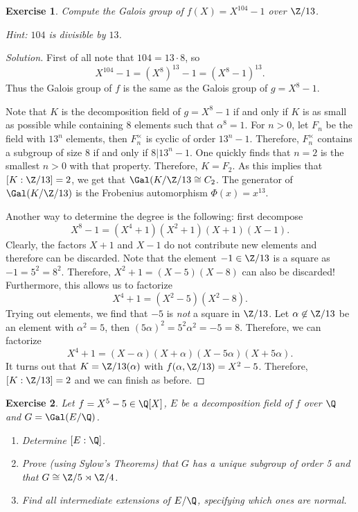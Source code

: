 \documentclass[a4paper,10pt,reqno]{amsart}
\newtheorem{ex}{Exercise}[section]
\newenvironment{sol}
  {\renewcommand\qedsymbol{$\blacksquare$}\begin{proof}[Solution]}
  {\end{proof}}
\begin{document}
\begin{ex}
\label{12.2}
    Compute the Galois group of $f(X)=X^{104}-1$
    over $\Z/{13}$.

    \noindent \textit{Hint:} $104$ is divisible by $13$.
\end{ex}
\begin{sol}
    First of all note that $104=13\cdot 8$,
so
$$X^{104}-1=(X^8)^{13}-1=(X^8-1)^{13}.$$
Thus the Galois group of $f$ is the 
same as the Galois group of $g=X^8-1$.

Note that $K$ is the decomposition field of $g=X^8-1$ if and only if $K$ is as small as possible while containing $8$ elements such that $\alpha^8 = 1$. For $n > 0$, let $F_n$ be the field with $13^n$ elements, then $F_n^{\times}$ is cyclic of order $13^n - 1$. Therefore, $F_n^{\times}$ contains a subgroup of size $8$ if and only if $8|13^n-1$. One quickly finds that $n=2$ is the smallest $n > 0$ with that property. Therefore, $K = F_2$. As this implies that $[K:\Z/{13}] = 2$, we get that $\Gal(K/\Z/{13} \cong C_2$. The generator of $\Gal(K/\Z/{13})$ is the Frobenius automorphism $\Phi(x) = x^{13}$.

Another way to determine the degree is the following: first decompose
\[
X^8 - 1 = (X^4 + 1) (X^2 + 1)(X+1)(X-1).
\]
Clearly, the factors $X+1$ and $X-1$ do not contribute new elements and therefore can be discarded. Note that the element $- 1 \in \Z/{13}$ is a square as $-1 = 5^2 = 8^2$. Therefore, $X^2 + 1 = (X-5)(X-8)$ can also be discarded! Furthermore, this allows us to factorize
\[
X^4 +1 = (X^2 -5)(X^2-8).
\]
Trying out elements, we find that $-5$ is \emph{not} a square in $\Z/{13}$. Let $\alpha \not\in \Z/{13}$ be an element with $\alpha^2 = 5$, then $(5\alpha)^2 = 5^2 \alpha^2 = -5 = 8$. Therefore, we can factorize
\[
X^4 + 1 = (X - \alpha)(X + \alpha)(X - 5\alpha)(X + 5\alpha).
\]
It turns out that $K = \Z/{13}(\alpha)$ with $f(\alpha,\Z/{13}) = X^2 - 5$. Therefore, $[K:\Z/{13}] = 2$ and we can finish as before.
\end{sol}


\begin{ex}
\label{12.3}
Let $f=X^5-5\in \Q[X]$, $E$ be a decomposition field of $f$ over $\Q$ and $G=\Gal(E/\Q)$.
\begin{enumerate}[label=(\roman*)]
    \item Determine $[E:\Q]$.
    \item Prove (using Sylow's Theorems)
    that $G$ has a unique subgroup of 
    order 5 and that $G\cong \Z/5\rtimes \Z/4$.
    \item Find all intermediate extensions of $E/\Q$,
    specifying which ones are normal.
\end{enumerate} 
\end{ex}
\end{document}
